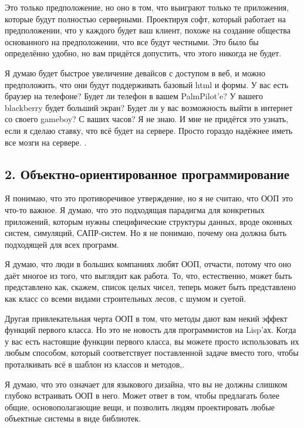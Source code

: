 \documentclass[ebook,12pt,oneside,openany]{memoir}
\begin{document}
Это только предположение, но оно в том, что выиграют только те
приложения, которые будут полностью серверными. Проектируя софт,
который работает на предположении, что у каждого будет ваш клиент,
похоже на создание общества основанного на предположении, что все
будут честными. Это было бы определённо удобно, но вам придётся
допустить, что этого никогда не будет. \newline

Я думаю будет быстрое увеличение девайсов с доступом в веб, и можно
предположить, что они будут поддерживать базовый html и формы. У вас
есть браузер на телефоне? Будет ли телефон в вашем PalmPilot'e? У
вашего blackberry будет больший экран? Будет ли у вас возможность
выйти в интернет со своего gameboy? С ваших часов? Я не знаю. И мне не
придётся это узнать, если я сделаю ставку, что всё будет на сервере.
Просто гораздо надёжнее иметь все мозги на сервере. . \newline

\subsection{2. Объектно-ориентированное программирование}

Я понимаю, что это противоречивое утверждение, но я не считаю, что ООП
это что-то важное. Я думаю, что это подходящая парадигма для
конкретных приложений, которым нужны специфические структуры данных,
вроде оконных систем, симуляций, САПР-систем. Но я не понимаю, почему
она должна быть подходящей для всех программ. \newline

Я думаю, что люди в больших компаниях любят ООП, отчасти, потому что
оно даёт многое из того, что выглядит как работа. То, что,
естественно, может быть представлено как, скажем, список целых чисел,
теперь может быть представлено как класс со всеми видами строительных
лесов, с шумом и суетой. \newline

Другая привлекательная черта ООП в том, что методы дают вам некий
эффект функций первого класса. Но это не новость для программистов на
Lisp'ах. Когда у вас есть настоящие функции первого класса, вы можете
просто использовать их любым способом, который соответствует
поставленной задаче вместо того, чтобы проталкивать всё в шаблон из
классов и методов,. \newline

Я думаю, что это означает для языкового дизайна, что вы не должны
слишком глубоко встраивать ООП в него. Может ответ в том, чтобы
предлагать более общие, основополагающие вещи, и позволить людям
проектировать любые объектные системы в виде библиотек. \newline
\end{document}
